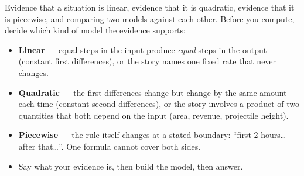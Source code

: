 \documentclass[12pt]{article}
\begin{document}

\noindent\small
Evidence that a situation is linear, evidence that it is quadratic, evidence
that it is piecewise, and comparing two models against each other. Before you
compute, decide which kind of model the evidence supports:
\begin{itemize}[leftmargin=1.1cm, itemsep=1pt, topsep=2pt]
  \item \textbf{Linear} --- equal steps in the input produce \emph{equal} steps
        in the output (constant first differences), or the story names one
        fixed rate that never changes.
  \item \textbf{Quadratic} --- the first differences change but change by the
        same amount each time (constant second differences), or the story
        involves a product of two quantities that both depend on the input
        (area, revenue, projectile height).
  \item \textbf{Piecewise} --- the rule itself changes at a stated boundary:
        ``first 2 hours\ldots{} after that\ldots''. One formula cannot cover
        both sides.
  \item Say what your evidence is, then build the model, then answer.
\end{itemize}
\normalsize

\vspace{0.2cm}


\end{document}
